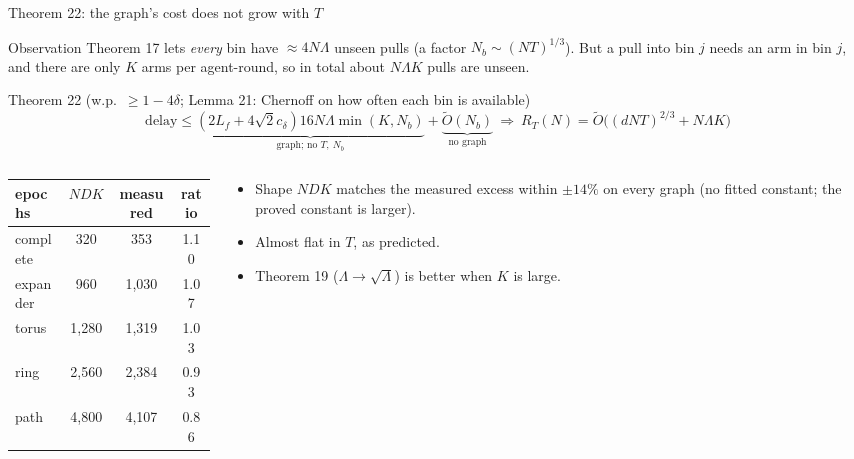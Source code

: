 \documentclass[11pt]{beamer}
\begin{document}
\begin{frame}{Theorem 22: the graph's cost does not grow with $T$}
\scriptsize
\begin{block}{Observation}
Theorem 17 lets \emph{every} bin have $\approx4N\Lambda$ unseen pulls (a factor $N_b\sim(NT)^{1/3}$). But a pull into bin $j$ needs an arm in bin $j$, and there are only $K$ arms per agent-round, so in total about $N\Lambda K$ pulls are unseen.
\end{block}
\begin{block}{Theorem 22 (w.p.\ $\ge1-4\delta$; Lemma 21: Chernoff on how often each bin is available)}
\vspace{-0.5em}
\[
\text{delay}\le\underbrace{(2L_f{+}4\sqrt2c_\delta)16N\Lambda\min(K,N_b)}_{\text{graph; no }T,\ N_b}+\underbrace{\tilde O(N_b)}_{\text{no graph}}
\ \Rightarrow\ R_T(N)=\tilde O\big((dNT)^{2/3}+N\Lambda K\big)
\]
\end{block}
\begin{columns}[c]
\begin{column}{0.5\textwidth}
\renewcommand{\arraystretch}{1.05}
\begin{tabular}{@{}lccc@{}}
\toprule
epochs & $NDK$ & measured & ratio\\
\midrule
complete & 320 & 353 & 1.10\\
expander & 960 & 1,030 & 1.07\\
torus & 1,280 & 1,319 & 1.03\\
ring & 2,560 & 2,384 & 0.93\\
path & 4,800 & 4,107 & 0.86\\
\bottomrule
\end{tabular}
\end{column}
\begin{column}{0.48\textwidth}
\begin{itemize}
\item Shape $NDK$ matches the measured excess within $\pm14\%$ on every graph (no fitted constant; the proved constant is larger).
\item Almost flat in $T$, as predicted.
\item Theorem 19 ($\Lambda\to\sqrt\Lambda$) is better when $K$ is large.
\end{itemize}
\end{column}
\end{columns}
\end{frame}
\end{document}
